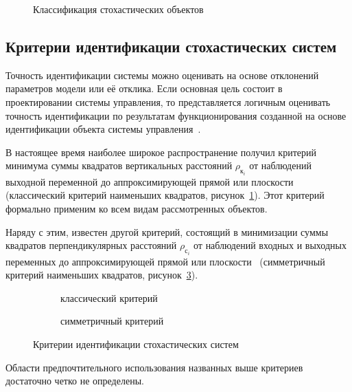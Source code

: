 \begin{figure}[p]
  \vspace{\baselineskip}
  \caption{Классификация стохастических объектов}
\end{figure}

\subsection{Критерии идентификации стохастических систем}

Точность идентификации системы можно оценивать на основе отклонений параметров модели или её отклика.
Если основная цель состоит в проектировании системы управления, то представляется логичным
оценивать точность идентификации по результатам функционирования созданной на основе идентификации
объекта системы управления~\cite{eikhoff_1975}.

В настоящее время наиболее широкое распространение получил критерий
минимума суммы квадратов вертикальных расстояний \( \rho_{\text{к}_i} \) от наблюдений выходной переменной
до аппроксимирующей прямой или плоскости
(классический критерий наименьших квадратов, рисунок~\ref{fig:criteria_classic}).
Этот критерий формально применим ко всем видам рассмотренных объектов.

Наряду с этим, известен другой критерий, состоящий в минимизации суммы квадратов
перпендикулярных расстояний \( \rho_{\text{с}_i} \) от наблюдений входных и выходных переменных до
аппроксимирующей прямой или плоскости~\cite{pearson_1901, mukha_2016}
(симметричный критерий наименьших квадратов, рисунок~\ref{fig:criteria_symmetric}).

\begin{figure}[h]
  \begin{subfigure}[b]{0.5\linewidth}
    \centering
    \caption{классический критерий}\label{fig:criteria_classic}
  \end{subfigure}
  \hfill
  \begin{subfigure}[b]{0.5\linewidth}
    \centering
    \caption{симметричный критерий}\label{fig:criteria_symmetric}
  \end{subfigure}

  \vspace{\baselineskip}
  \caption{Критерии идентификации стохастических систем}
\end{figure}

Области предпочтительного использования названных выше критериев достаточно четко не определены.

